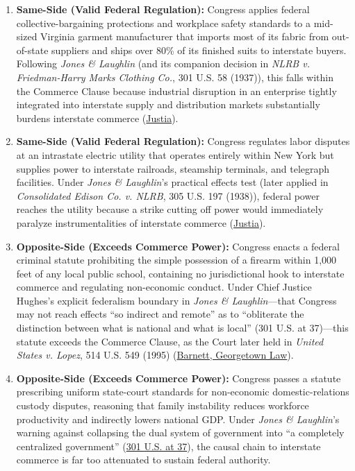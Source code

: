 \documentclass[12pt]{article}
\begin{document}
\begin{enumerate}
\item \textbf{Same-Side (Valid Federal Regulation):} Congress applies federal collective-bargaining protections and workplace safety standards to a mid-sized Virginia garment manufacturer that imports most of its fabric from out-of-state suppliers and ships over 80\% of its finished suits to interstate buyers. Following \textit{Jones \& Laughlin} (and its companion decision in \textit{NLRB v. Friedman-Harry Marks Clothing Co.}, 301 U.S. 58 (1937)), this falls within the Commerce Clause because industrial disruption in an enterprise tightly integrated into interstate supply and distribution markets substantially burdens interstate commerce (\href{https://supreme.justia.com/cases/federal/us/301/58/}{Justia}).

\item \textbf{Same-Side (Valid Federal Regulation):} Congress regulates labor disputes at an intrastate electric utility that operates entirely within New York but supplies power to interstate railroads, steamship terminals, and telegraph facilities. Under \textit{Jones \& Laughlin}'s practical effects test (later applied in \textit{Consolidated Edison Co. v. NLRB}, 305 U.S. 197 (1938)), federal power reaches the utility because a strike cutting off power would immediately paralyze instrumentalities of interstate commerce (\href{https://supreme.justia.com/cases/federal/us/305/197/}{Justia}).

\item \textbf{Opposite-Side (Exceeds Commerce Power):} Congress enacts a federal criminal statute prohibiting the simple possession of a firearm within 1,000 feet of any local public school, containing no jurisdictional hook to interstate commerce and regulating non-economic conduct. Under Chief Justice Hughes's explicit federalism boundary in \textit{Jones \& Laughlin}---that Congress may not reach effects ``so indirect and remote'' as to ``obliterate the distinction between what is national and what is local'' (301 U.S. at 37)---this statute exceeds the Commerce Clause, as the Court later held in \textit{United States v. Lopez}, 514 U.S. 549 (1995) (\href{https://scholarship.law.georgetown.edu/cgi/viewcontent.cgi?article=1433&context=facpub&sei-redir=1}{Barnett, Georgetown Law}).

\item \textbf{Opposite-Side (Exceeds Commerce Power):} Congress passes a statute prescribing uniform state-court standards for non-economic domestic-relations custody disputes, reasoning that family instability reduces workforce productivity and indirectly lowers national GDP. Under \textit{Jones \& Laughlin}'s warning against collapsing the dual system of government into ``a completely centralized government'' (\href{https://supreme.justia.com/cases/federal/us/301/1/}{301 U.S. at 37}), the causal chain to interstate commerce is far too attenuated to sustain federal authority.


\end{enumerate}
\end{document}

